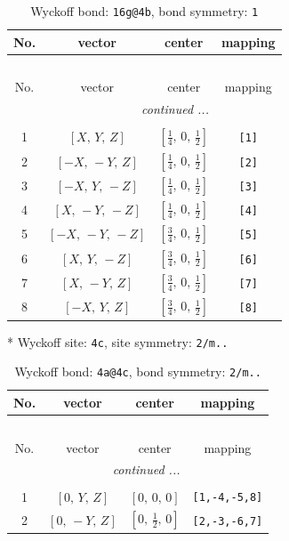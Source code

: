 \documentclass[fleqn,8pt]{jsarticle}
\begin{document}
\begin{longtable}{cccc}
\caption{Wyckoff bond: {\tt 16g@4b}, bond symmetry: {\tt 1}}
 \\
 \hline \hline
No. & vector & center & mapping \\ \hline \endfirsthead

\multicolumn{3}{l}{\tablename\ \thetable{}} \\
 \hline \hline
No. & vector & center & mapping \\ \hline \endhead

 \hline \hline
\multicolumn{3}{r}{\footnotesize\it continued ...} \\ \endfoot

 \hline \hline
\multicolumn{3}{r}{} \\ \endlastfoot

1 & $\left[ X,\, Y,\, Z \right]$ & $\left[ \frac{1}{4},\, 0,\, \frac{1}{2} \right]$ & {\tt [1]} \\ \hline
2 & $\left[ - X,\, - Y,\, Z \right]$ & $\left[ \frac{1}{4},\, 0,\, \frac{1}{2} \right]$ & {\tt [2]} \\ \hline
3 & $\left[ - X,\, Y,\, - Z \right]$ & $\left[ \frac{1}{4},\, 0,\, \frac{1}{2} \right]$ & {\tt [3]} \\ \hline
4 & $\left[ X,\, - Y,\, - Z \right]$ & $\left[ \frac{1}{4},\, 0,\, \frac{1}{2} \right]$ & {\tt [4]} \\ \hline
5 & $\left[ - X,\, - Y,\, - Z \right]$ & $\left[ \frac{3}{4},\, 0,\, \frac{1}{2} \right]$ & {\tt [5]} \\ \hline
6 & $\left[ X,\, Y,\, - Z \right]$ & $\left[ \frac{3}{4},\, 0,\, \frac{1}{2} \right]$ & {\tt [6]} \\ \hline
7 & $\left[ X,\, - Y,\, Z \right]$ & $\left[ \frac{3}{4},\, 0,\, \frac{1}{2} \right]$ & {\tt [7]} \\ \hline
8 & $\left[ - X,\, Y,\, Z \right]$ & $\left[ \frac{3}{4},\, 0,\, \frac{1}{2} \right]$ & {\tt [8]} \\
\end{longtable}
* Wyckoff site: {\tt 4c}, site symmetry: {\tt 2/m..}
\renewcommand{\arraystretch}{1.2}
\begin{longtable}{cccc}
\caption{Wyckoff bond: {\tt 4a@4c}, bond symmetry: {\tt 2/m..}}
 \\
 \hline \hline
No. & vector & center & mapping \\ \hline \endfirsthead

\multicolumn{3}{l}{\tablename\ \thetable{}} \\
 \hline \hline
No. & vector & center & mapping \\ \hline \endhead

 \hline \hline
\multicolumn{3}{r}{\footnotesize\it continued ...} \\ \endfoot

 \hline \hline
\multicolumn{3}{r}{} \\ \endlastfoot

1 & $\left[ 0,\, Y,\, Z \right]$ & $\left[ 0,\, 0,\, 0 \right]$ & {\tt [1,-4,-5,8]} \\ \hline
2 & $\left[ 0,\, - Y,\, Z \right]$ & $\left[ 0,\, \frac{1}{2},\, 0 \right]$ & {\tt [2,-3,-6,7]} \\
\end{longtable}
\end{document}
